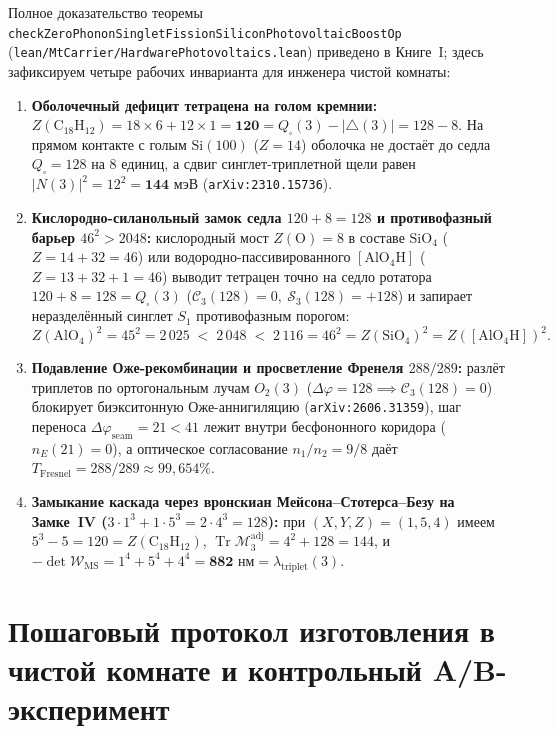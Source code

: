 Полное доказательство теоремы \texttt{checkZeroPhononSingletFissionSiliconPhotovoltaicBoostOp} (\texttt{lean/MtCarrier/HardwarePhotovoltaics.lean}) приведено в Книге~I; здесь зафиксируем четыре рабочих инварианта для инженера чистой комнаты:
\begin{enumerate}[label=\textbf{\arabic*.},noitemsep]
\item \textbf{Оболочечный дефицит тетрацена на голом кремнии:}
  $Z(\mathrm{C_{18}H_{12}}) = 18\times 6 + 12\times 1 = \mathbf{120} = Q_\square(3) - |{\triangle}(3)| = 128 - 8$. На прямом контакте с голым $\mathrm{Si}(100)$ ($Z=14$) оболочка не достаёт до седла $Q_\square = 128$ на $8$ единиц, а сдвиг синглет-триплетной щели равен $|N(3)|^2 = 12^2 = \mathbf{144\text{ мэВ}}$ (\texttt{arXiv:2310.15736}).
\item \textbf{Кислородно-силанольный замок седла $120 + 8 = 128$ и противофазный барьер $46^2 > 2048$:}
  кислородный мост $Z(\mathrm{O}) = 8$ в составе $\mathrm{SiO_4}$ ($Z = 14 + 32 = 46$) или водородно-пассивированного $[\mathrm{AlO_4H}]$ ($Z = 13 + 32 + 1 = 46$) выводит тетрацен точно на седло ротатора $120 + 8 = 128 = Q_\square(3)$ ($\mathcal{C}_3(128) = 0,\ \mathcal{S}_3(128) = +128$) и запирает неразделённый синглет $S_1$ противофазным порогом:
  \begin{equation}
    \label{eq:lab-pauli-passivation}
    Z(\mathrm{AlO_4})^2 = 45^2 = 2\,025 \;<\; 2\,048 \;<\; 2\,116 = 46^2 = Z(\mathrm{SiO_4})^2 = Z([\mathrm{AlO_4H}])^2.
  \end{equation}
\item \textbf{Подавление Оже-рекомбинации и просветление Френеля $288/289$:}
  разлёт триплетов по ортогональным лучам $O_2(3)$ ($\Delta\varphi = 128 \implies \mathcal{C}_3(128) = 0$) блокирует биэкситонную Оже-аннигиляцию (\texttt{arXiv:2606.31359}), шаг переноса $\Delta\varphi_{\mathrm{seam}} = 21 < 41$ лежит внутри бесфононного коридора ($\hat{n}_E(21) = 0$), а оптическое согласование $n_1/n_2 = 9/8$ даёт $T_{\mathrm{Fresnel}} = 288/289 \approx 99{,}654\%$.
\item \textbf{Замыкание каскада через вронскиан Мейсона--Стотерса--Безу на Замке~IV ($3\cdot 1^3 + 1\cdot 5^3 = 2\cdot 4^3 = 128$):}
  при $(X,Y,Z) = (1,5,4)$ имеем $5^3 - 5 = 120 = Z(\mathrm{C_{18}H_{12}})$, $\operatorname{Tr}\mathcal{M}_3^{\mathrm{adj}} = 4^2 + 128 = 144$, и $-\det\mathcal{W}_{\mathrm{MS}} = 1^4 + 5^4 + 4^4 = \mathbf{882\text{ нм}} = \lambda_{\mathrm{triplet}}(3)$.
\end{enumerate}

\section{Пошаговый протокол изготовления в чистой комнате и контрольный A/B-эксперимент}

